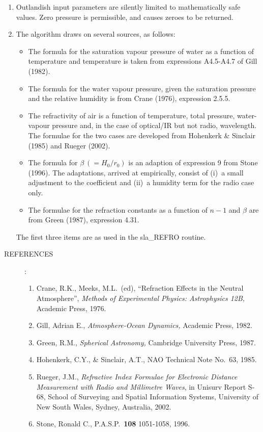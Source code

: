 \documentclass[11pt,twoside]{article}
\newcommand{\arcsec}[2] {\arcseci{#1}$\hspace{-0.4em}.#2$}
\newcommand{\arcsec}[2] {
      {$#1\hspace{-0.05em}^{'\hspace{-0.1em}'}\hspace{-0.4em}.#2$}
   }
\newcommand{\arcseci}[1] {$#1\hspace{-0.05em}$\raisebox{-0.5ex}
                         {$^{'\hspace{-0.1em}'}$}}
\renewcommand{\arcseci}[1] {$#1\hspace{-0.05em}^{'\hspace{-0.1em}'}$}
\newlength{\oldspacing}
\newcommand{\refs}[1]
{
  \goodbreak
  \setlength{\oldspacing}{\topsep}
  \setlength{\topsep}{0.3ex}
  \begin{description}
    \item[REFERENCES]:
        #1
  \end{description}
  \setlength{\topsep}{\oldspacing}
}
\newcommand{\refs}[1]
   {
     \begin{description}
       \item[REFERENCES:]
           #1
     \end{description}
   }
\begin{document}
{\begin{enumerate}
        The results from the much slower but more accurate sla\_REFCO
        routine have not been included in the tabulation as they are
        identical to those in the sla\_REFRO column to the \arcsec{0}{01}
        resolution used.
  \item Outlandish input parameters are silently limited
        to mathematically safe values.  Zero pressure is permissible,
        and causes zeroes to be returned.
  \item The algorithm draws on several sources, as follows:
        \begin{itemize}
        \item The formula for the saturation vapour pressure of water as
              a function of temperature and temperature is taken from
              expressions A4.5-A4.7 of Gill (1982).
        \item The formula for the water vapour pressure, given the
              saturation pressure and the relative humidity is from
              Crane (1976), expression 2.5.5.
        \item The refractivity of air is a function of temperature,
              total pressure, water-vapour pressure and, in the case
              of optical/IR but not radio, wavelength.  The formulae
              for the two cases are developed from Hohenkerk \& Sinclair
              (1985) and Rueger (2002).
        \item The formula for $\beta~(=H_0/r_0)$ is
              an adaption of expression 9 from Stone (1996).  The
              adaptations, arrived at empirically, consist of (i)~a
              small adjustment to the coefficient and (ii)~a humidity
              term for the radio case only.
        \item The formulae for the refraction constants as a function of
              $n-1$ and $\beta$ are from Green (1987), expression 4.31.
        \end{itemize}
        The first three items are as used in the sla\_REFRO routine.
 \end{enumerate}
}
\refs
{
 \begin{enumerate}
  \item Crane, R.K., Meeks, M.L.\ (ed), ``Refraction Effects in
        the Neutral Atmosphere'',
        {\it Methods of Experimental Physics: Astrophysics 12B,}\/
        Academic Press, 1976.
  \item Gill, Adrian E., {\it Atmosphere-Ocean Dynamics,}\/
        Academic Press, 1982.
  \item Green, R.M., {\it Spherical Astronomy,}\/ Cambridge
        University Press, 1987.
  \item Hohenkerk, C.Y., \& Sinclair, A.T., NAO Technical Note
        No.~63, 1985.
  \item Rueger, J.M., {\it Refractive Index Formulae for
        Electronic Distance Measurement with Radio and Millimetre
        Waves}, in Unisurv Report S-68, School of Surveying
        and Spatial Information Systems, University of New South
        Wales, Sydney, Australia, 2002.
  \item Stone, Ronald C., P.A.S.P.~{\bf 108} 1051-1058, 1996.
 \end{enumerate}
}
\end{document}

